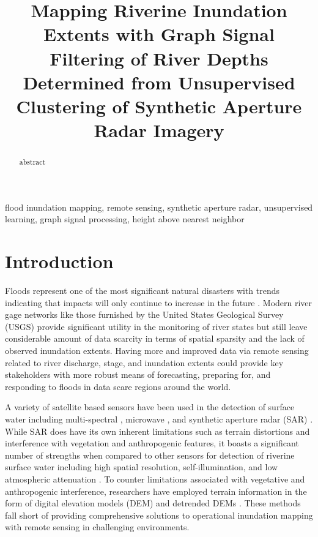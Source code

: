 \documentclass{article}
\title{Mapping Riverine Inundation Extents with Graph Signal Filtering of River Depths Determined from Unsupervised Clustering of Synthetic Aperture Radar Imagery}
\begin{document}
%
\maketitle
%
\begin{abstract}
abstract
\end{abstract}
%
\begin{keywords}
flood inundation mapping, remote sensing, synthetic aperture radar, unsupervised learning, graph signal processing, height above nearest neighbor 
\end{keywords}
%
\section{Introduction}
\label{sec:intro}

Floods represent one of the most significant natural disasters \cite{national_weather_service_2020,national_weather_service_2019,national_weather_service_2018,us_department_of_commerce_2020} with trends indicating that impacts will only continue to increase in the future \cite{mallakpour2015changing,downton2005reanalysis,kunkel1999temporal,pielke2000precipitation,corringham2019effect,tabari2020climate,milly2002increasing,wing2018estimates}. 
Modern river gage networks like those furnished by the United States Geological Survey (USGS) provide significant utility in the monitoring of river states but still leave considerable amount of data scarcity in terms of spatial sparsity and the lack of observed inundation extents. 
Having more and improved data via remote sensing related to river discharge, stage, and inundation extents could provide key stakeholders with more robust means of forecasting, preparing for, and responding to floods in data scare regions around the world.

A variety of satellite based sensors have been used in the detection of surface water including multi-spectral \cite{nigro2014nasa,sanyal2004application,wang2004using,brakenridge2006modis,jain2005delineation,nghiem2000flood,hussain2011mapping,frazier2000water,dewan2006flood,brivio2002integration}, microwave \cite{de2015global,schumann2015microwave,de2010flood,bindlish2008role,de2009global,kundu2015flood}, and synthetic aperture radar (SAR) \cite{aristizabal2020high,shastry2019using,martinis2010automatic,kudahetty2012flood,schlaffer2015flood,chini2019sentinel,chaabani2018flood,huang2018automated,saatchi2019sar,kasischke2003effects,hess2003dual}.
While SAR does have its own inherent limitations such as terrain distortions and interference with vegetation and anthropogenic features, it boasts a significant number of strengths when compared to other sensors for detection of riverine surface water including high spatial resolution, self-illumination, and low atmospheric attenuation \cite{saatchi2019sar,muckenhuber2016open}.
To counter limitations associated with vegetative and anthropogenic interference, researchers have employed terrain information in the form of digital elevation models (DEM) and detrended DEMs \cite{townsend1998modeling,aristizabal2020high,shastry2019using,saatchi2019sar,twele2016sentinel,huang2017comparison}.
These methods fall short of providing comprehensive solutions to operational inundation mapping with remote sensing in challenging environments.
\end{document}
